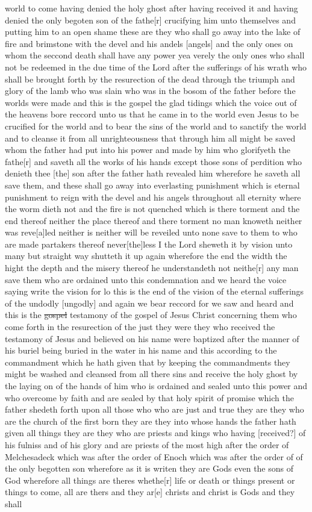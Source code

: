 world to come having denied the holy ghost after having received it and having denied the only begoten son of the fathe[r] crucifying him unto themselves and putting him to an open shame these are they who shall go away into the lake of fire and brimstone with the devel and his andels [angels] and the only ones on whom the seccond death shall have any power yea verely the only ones who shall not be redeemed in the due time of the Lord after the sufferings of his wrath who shall be brought forth by the resurection of the dead through the triumph and glory of the lamb who was slain who was in the bosom of the father before the worlds were made and this is the gospel the glad tidings which the voice out of the heavens bore reccord unto us that he came in to the world even Jesus to be crucified for the world and to bear the sins of the world and to sanctify the world and to cleanse it from all unrighteousness that through him all might be saved whom the father had put into his power and made by him who glorifyeth the fathe[r] and saveth all the works of his hands except those sons of perdition who denieth thee [the] son after the father hath revealed him wherefore he saveth all save them, and these shall go away into everlasting punishment which is eternal punishment to reign with the devel and his angels throughout all eternity where the worm dieth not and the fire is not quenched which is there torment and the end thereof neither the place thereof and there torment no man knoweth neither was reve[a]led neither is neither will be reveiled unto none save to them to who are made partakers thereof never[the]less I the Lord sheweth it by vision unto many but straight way shutteth it up again wherefore the end the width the hight the depth and the misery thereof he understandeth not neithe[r] any man save them who are ordained unto this condemnation and we heard the voice saying write the vision for lo this is the end of the vision of the eternal sufferings of the undodly [ungodly] and again we bear reccord for we saw and heard and this is the \sout{gospel} testamony of the gospel of Jesus Christ concerning them who come forth in the resurection of the just they were they who received the testamony of Jesus and believed on his name were baptized after the manner of his buriel being buried in the water in his name and this according to the commandment which he hath given that by keeping the commandments they might be washed and cleansed from all there sins and receive the holy ghost by the laying on of the hands of him who is ordained and sealed unto this power and who overcome by faith and are sealed by that holy spirit of promise which the father shedeth forth upon all those who who are just and true they are they who are the church of the first born they are they into whose hands the father hath given all things they are they who are priests and kings who having [received?] of his fulniss and of his glory and are priests of the most high after the order of Melchesadeck which was after the order of Enoch which was after the order of of the only begotten son wherefore as it is writen they are Gods even the sons of God wherefore all things are theres whethe[r] life or death or things present or things to come, all are thers and they ar[e] christs and christ is Gods and they shall 